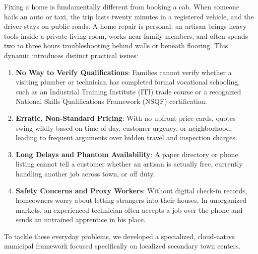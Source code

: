 \documentclass[10pt,twocolumn,a4paper]{article}
\begin{document}
Fixing a home is fundamentally different from booking a cab. When someone hails an auto or taxi, the trip lasts twenty minutes in a registered vehicle, and the driver stays on public roads. A home repair is personal: an artisan brings heavy tools inside a private living room, works near family members, and often spends two to three hours troubleshooting behind walls or beneath flooring. This dynamic introduces distinct practical issues:
\begin{enumerate}
    \item \textbf{No Way to Verify Qualifications}: Families cannot verify whether a visiting plumber or technician has completed formal vocational schooling, such as an Industrial Training Institute (ITI) trade course or a recognized National Skills Qualifications Framework (NSQF) certification.
    \item \textbf{Erratic, Non-Standard Pricing}: With no upfront price cards, quotes swing wildly based on time of day, customer urgency, or neighborhood, leading to frequent arguments over hidden travel and inspection charges.
    \item \textbf{Long Delays and Phantom Availability}: A paper directory or phone listing cannot tell a customer whether an artisan is actually free, currently handling another job across town, or off duty.
    \item \textbf{Safety Concerns and Proxy Workers}: Without digital check-in records, homeowners worry about letting strangers into their houses. In unorganized markets, an experienced technician often accepts a job over the phone and sends an untrained apprentice in his place.
\end{enumerate}

To tackle these everyday problems, we developed a specialized, cloud-native municipal framework focused specifically on localized secondary town centers.
\end{document}

